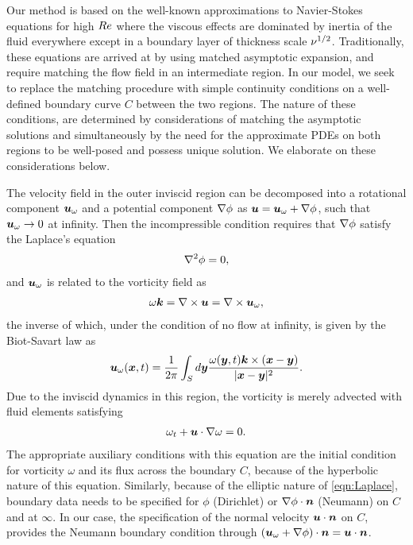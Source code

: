 Our method is based on the well-known approximations to Navier-Stokes equations for high $Re$ where the viscous effects are dominated by inertia of the fluid everywhere except in a boundary layer of thickness scale $\nu^{1/2}$. 
Traditionally, these equations are arrived at by using matched asymptotic expansion, and require matching the flow field in an intermediate region.
In our model, we seek to replace the matching procedure with simple continuity conditions on a well-defined boundary curve $C$ between the two regions.
The nature of these conditions, are determined by considerations of matching the asymptotic solutions and simultaneously by the need for the approximate PDEs on both regions to be well-posed and possess unique solution.
We elaborate on these considerations below.

The velocity field in the outer inviscid region can be decomposed into a rotational component $\boldsymbol{u}_{\omega}$ and a potential component $\nabla \phi$ as $\boldsymbol{u} = \boldsymbol{u}_{\omega} + \nabla \phi$, such that $\boldsymbol{u}_\omega\to 0$ at infinity.
Then the incompressible condition requires that $\nabla \phi$ satisfy the Laplace's equation
\begin{align}
\label{eqn:Laplace}
\nabla^2 \phi = 0,
\end{align}
and $\boldsymbol{u}_\omega$ is related to the vorticity field as
\begin{align}
\omega \boldsymbol{k} = \nabla \times \boldsymbol{u} = \nabla \times \boldsymbol{u}_{\omega},
\end{align}
the inverse of which, under the condition of no flow at infinity, is given by the Biot-Savart law as
\begin{align}
\label{eqn:Biot-Savart}
\boldsymbol{u}_{\omega} (\boldsymbol{x}, t) =  \frac{1}{2\pi} \int_{S} d\boldsymbol{y} \frac{\omega(\boldsymbol{y}, t)\boldsymbol{k} \times (\boldsymbol{x} - \boldsymbol{y})}{|\boldsymbol{x} - \boldsymbol{y}|^2}.
\end{align}
Due to the inviscid dynamics in this region, the vorticity is merely advected with fluid elements satisfying
\begin{align}
 \omega_t + \boldsymbol{u}\cdot\nabla\omega = 0. \label{eqn:Vorticity}
\end{align}
The appropriate auxiliary conditions with this equation are the initial condition for vorticity $\omega$ and its flux across the boundary $C$, because of the hyperbolic nature of this equation. 
Similarly, because of the elliptic nature of \eqref{eqn:Laplace}, boundary data needs to be specified for $\phi$ (Dirichlet) or $\nabla \phi \cdot \boldsymbol{n}$ (Neumann) on $C$ and at $\infty$.
In our case, the specification of the normal velocity $\boldsymbol{u} \cdot \boldsymbol{n}$ on $C$, provides the Neumann boundary condition through $(\boldsymbol{u}_\omega + \nabla \phi) \cdot \boldsymbol{n} = \boldsymbol{u} \cdot \boldsymbol{n}$.

